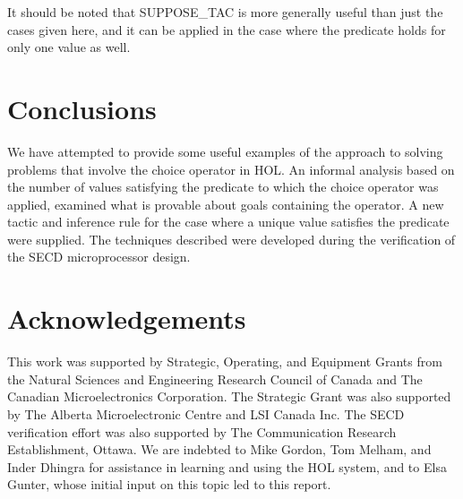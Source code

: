 It should be noted that SUPPOSE\_TAC is more generally useful than
just the cases given here, and it can be applied in the case where the
predicate holds for only one value as well.

\section{Conclusions}
We have attempted to provide some useful examples of the approach to
solving problems that involve the choice operator in HOL.  An informal
analysis based on the number of values satisfying the predicate to
which the choice operator was applied, examined what is provable about
goals containing the operator.  A new tactic and inference rule for
the case where a unique value satisfies the predicate were supplied.
The techniques described were developed during the verification of the
SECD microprocessor design.  

\section*{Acknowledgements}
This work was supported by Strategic, Operating, and Equipment Grants
from the Natural Sciences and Engineering Research Council of Canada
and The Canadian Microelectronics Corporation.  The Strategic Grant
was also supported by The Alberta Microelectronic Centre and LSI
Canada Inc.  The SECD verification effort was also supported by The
Communication Research Establishment, Ottawa.  
We are indebted to Mike Gordon, Tom Melham, and Inder Dhingra for
assistance in learning and using the HOL system, and to Elsa Gunter,
whose initial input on this topic led to this report.


\nocite{Hol89a}
{\small



}

